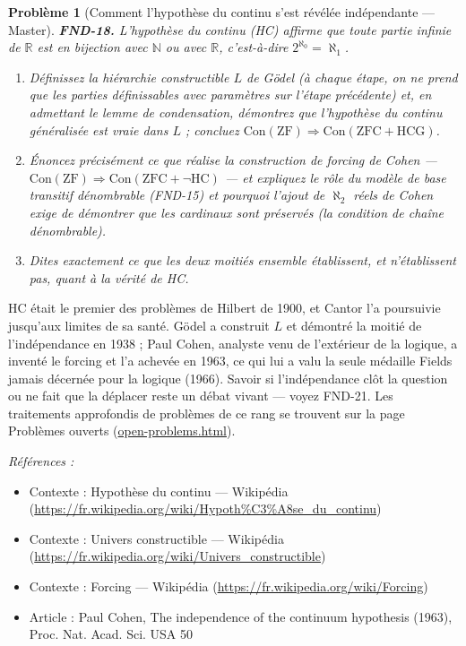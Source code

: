 \documentclass[11pt]{article}
\newtheorem{problem}{Problème}
\newenvironment{refs}{\par\small\noindent\emph{Références :}\begin{itemize}\setlength\itemsep{0pt}}{\end{itemize}\normalsize}
\begin{document}
\bigskip

\begin{problem}[{Comment l'hypothèse du continu s'est révélée indépendante --- Master}]
\textbf{FND-18.} L'hypothèse du continu (HC) affirme que toute partie infinie
de $\mathbb{R}$ est en bijection avec $\mathbb{N}$ ou avec $\mathbb{R}$, c'est-à-dire $ 2^{\aleph_0} = \aleph_1 $.
\begin{enumerate}
\item[(a)] Définissez la hiérarchie constructible $ L $ de Gödel (à chaque étape, on ne prend que les
parties définissables avec paramètres sur l'étape précédente) et, en admettant le lemme de
condensation, démontrez que l'hypothèse du continu généralisée est vraie dans $ L $ ; concluez
$ \mathrm{Con}(\mathrm{ZF}) \Rightarrow \mathrm{Con}(\mathrm{ZFC} + \mathrm{HCG}) $.
\item[(b)] Énoncez précisément ce que réalise la construction de forcing de Cohen ---
$ \mathrm{Con}(\mathrm{ZF}) \Rightarrow \mathrm{Con}(\mathrm{ZFC} + \neg\mathrm{HC}) $ ---
et expliquez le rôle du modèle de base transitif dénombrable (FND-15) et pourquoi l'ajout de
$ \aleph_2 $ réels de Cohen exige de démontrer que les cardinaux sont préservés (la condition
de chaîne dénombrable).
\item[(c)] Dites exactement ce que les deux moitiés ensemble établissent, et n'établissent pas, quant à
la vérité de HC.
\end{enumerate}

\end{problem}

\noindent HC était le premier des problèmes de Hilbert de 1900, et Cantor l'a poursuivie
jusqu'aux limites de sa santé. Gödel a construit $ L $ et démontré la moitié de l'indépendance
en 1938 ; Paul Cohen, analyste venu de l'extérieur de la logique, a inventé le forcing et l'a
achevée en 1963, ce qui lui a valu la seule médaille Fields jamais décernée pour la logique
(1966). Savoir si l'indépendance clôt la question ou ne fait que la déplacer reste un débat vivant
--- voyez FND-21. Les traitements approfondis de problèmes de ce rang se trouvent sur la page
Problèmes ouverts (\url{open-problems.html}).

\begin{refs}
\item Contexte : Hypothèse du continu --- Wikipédia (\url{https://fr.wikipedia.org/wiki/Hypoth%C3%A8se_du_continu})
\item Contexte : Univers constructible --- Wikipédia (\url{https://fr.wikipedia.org/wiki/Univers_constructible})
\item Contexte : Forcing --- Wikipédia (\url{https://fr.wikipedia.org/wiki/Forcing})
\item Article : Paul Cohen, \og{} The independence of the continuum hypothesis \fg{} (1963), Proc. Nat. Acad. Sci. USA 50
\end{refs}
\end{document}
